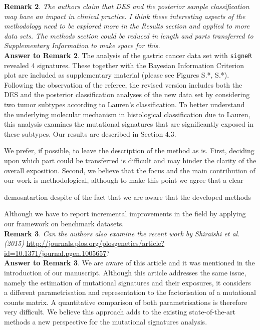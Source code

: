\documentclass[11pt]{amsart}
\begin{document}
\textbf{Remark 2}. \emph{The authors claim that DES and the posterior sample classification may have an impact in clinical practice. I think these interesting aspects of the methodology need to be explored more in the Results section and applied to more data sets. The methods section could be reduced in length and parts transferred to Supplementary Information to make space for this.}
\\

\textbf{Answer to Remark 2}. The analysis of the gastric cancer data set with \texttt{signeR} revealed 4 signatures. These together with the Bayesian Information Criterion plot are included as supplementary material (please see Figures S.*, S.*).  Following the observation of the referee, the revised version includes both the DES and the posterior classification analyses of the new data set by considering two tumor subtypes according to Lauren's classification.
To better understand the underlying molecular mechanism  in histological classification due to Lauren, this analysis examines the mutational signatures that are significantly exposed in these subtypes. Our results are described in Section 4.3.

We prefer, if possible, to leave the description of the method as is. First, deciding upon which part could be transferred is difficult and may hinder the clarity of the overall exposition. Second, we believe that the focus and the main contribution of our work is methodological, although to make this point we agree that a clear

demosntartion  despite of the fact that we are aware that the developed methods

Although we have to report incremental improvements in the field by applying our framework on benchmark datasets.
\\

\textbf{Remark 3}. \emph{Can the authors also examine the recent work by Shiraishi et al. (2015)}
\url{http://journals.plos.org/plosgenetics/article?id=10.1371/journal.pgen.1005657}?
\\

\textbf{Answer to Remark 3}. We are aware of this article and it was mentioned in the introduction of our manuscript. Although this article addresses the same issue, namely the estimation of mutational signatures and their exposures, it considers a different parametrisation and representation to the factorisation of a mutational counts matrix. A quantitative comparison of both parametrisations is therefore very difficult. We believe this approach adds to the existing state-of-the-art methods a new perspective for the mutational signatures analysis.
\end{document}
